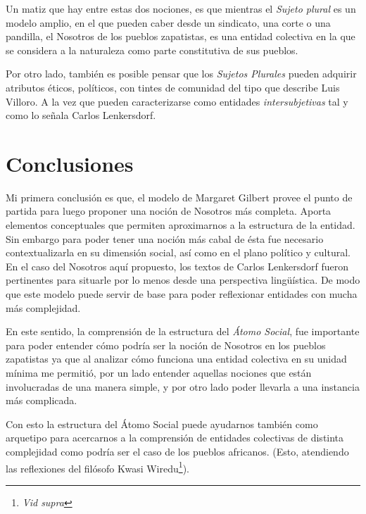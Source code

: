 \documentclass[oneside]{book}
\begin{document}
Un matiz que hay entre estas dos nociones, es que mientras el \textit{Sujeto plural} es un modelo amplio, en el que pueden caber desde un sindicato, una corte o una pandilla, el Nosotros de los pueblos zapatistas, es una entidad colectiva en la que se considera a la naturaleza como parte constitutiva de sus pueblos.
	
Por otro lado, también es posible pensar que los \textit{Sujetos Plurales} pueden adquirir atributos éticos, políticos, con tintes de comunidad del tipo que describe Luis Villoro. A la vez que pueden caracterizarse como entidades \textit{intersubjetivas} tal y como lo señala Carlos Lenkersdorf.
	
\chapter*{Conclusiones}


Mi primera conclusión es que, el modelo de Margaret Gilbert provee el punto de partida para luego proponer una noción de Nosotros más completa. Aporta elementos conceptuales que permiten aproximarnos a la estructura de la entidad. Sin embargo para poder tener una noción más cabal de ésta fue necesario contextualizarla en su dimensión social, así como en el plano político y cultural. En el caso del Nosotros aquí propuesto, los textos de Carlos Lenkersdorf fueron pertinentes para situarle por lo menos desde una perspectiva lingüística. De modo que este modelo puede servir de base para poder reflexionar entidades con mucha más complejidad.

En este sentido, la comprensión de la estructura del \textit{Átomo Social}, fue importante para poder entender cómo podría ser la noción de Nosotros en los pueblos zapatistas ya que al analizar cómo funciona una entidad colectiva en su unidad mínima me permitió, por un lado entender aquellas nociones que están involucradas de una manera simple, y por otro lado poder llevarla a una instancia más complicada.

Con esto la estructura del Átomo Social puede ayudarnos también como arquetipo para acercarnos a la comprensión de entidades colectivas de distinta complejidad como podría ser el caso de los pueblos africanos. (Esto, atendiendo las reflexiones del filósofo Kwasi Wiredu\footnote{\textit{Vid supra}}).
\end{document}
